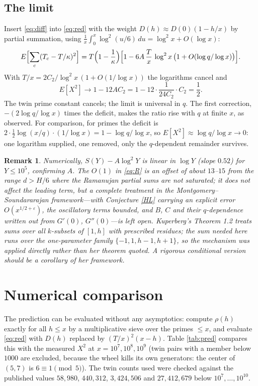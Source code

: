 \documentclass[11pt]{article}
\newtheorem{remark}[theorem]{Remark}
\begin{document}
\subsection{The limit}
Insert \eqref{eq:diff} into \eqref{eq:red} with the weight $D(h)\approx D(0)(1-h/x)$ by partial summation, using $\frac1x\int_0^x\log^2(u/6)\,du=\log^2x+O(\log x)$:
\[
E\Bigl[\sum_c (T_c-T/\kappa)^2\Bigr]=T\Bigl(1-\frac1\kappa\Bigr)\Bigl[1-6A\,\frac Tx\,\log^2x\,\bigl(1+O(\log q/\log x)\bigr)\Bigr].
\]
With $T/x=2C_2/\log^2x\,(1+O(1/\log x))$ the logarithms cancel and
\[
E[X^2]\longrightarrow 1-12AC_2=1-12\cdot\frac1{24C_2}\cdot C_2=\frac12.
\]
The twin prime constant cancels; the limit is universal in $q$. The first correction, $-(2\log q/\log x)$ times the deficit, makes the ratio rise with $q$ at finite $x$, as observed. For comparison, for primes the deficit is $2\cdot\frac12\log(x/q)\cdot(1/\log x)=1-\log q/\log x$, so $E[X^2]\approx\log q/\log x\to0$: one logarithm supplied, one removed, only the $q$-dependent remainder survives.

\begin{remark}
Numerically, $S(Y)-A\log^2Y$ is linear in $\log Y$ (slope $0.52$) for $Y\le10^5$, confirming $A$. The $O(1)$ in \eqref{eq:R} is an offset of about $13$--$15$ from the range $d>H/6$ where the Ramanujan partial sums are not saturated; it does not affect the leading term, but a complete treatment in the Montgomery--Soundararajan framework---with Conjecture \ref{HL} carrying an explicit error $O(x^{1/2+\varepsilon})$, the oscillatory terms bounded, and $B$, $C$ and their $q$-dependence written out from $G'(0)$, $G''(0)$---is left open. Kuperberg's Theorem 1.2 \cite{Kuperberg} treats sums over all $k$-subsets of $[1,h]$ with prescribed residues; the sum needed here runs over the one-parameter family $\{-1,1,h-1,h+1\}$, so the mechanism was applied directly rather than her theorem quoted. A rigorous conditional version should be a corollary of her framework.
\end{remark}

\section{Numerical comparison}\label{sec:numerics}

The prediction can be evaluated without any asymptotics: compute $\rho(h)$ exactly for all $h\le x$ by a multiplicative sieve over the primes $\le x$, and evaluate \eqref{eq:red} with $D(h)$ replaced by $(T/x)^2(x-h)$. Table \ref{tab:pred} compares this with the measured $X^2$ at $x=10^7,10^8,10^9$ (twin pairs with a member below $1000$ are excluded, because the wheel kills its own generators: the center of $(5,7)$ is $6\equiv1\pmod5$). The twin counts used were checked against the published values $58{,}980$, $440{,}312$, $3{,}424{,}506$ and $27{,}412{,}679$ below $10^7,\dots,10^{10}$.
\end{document}
